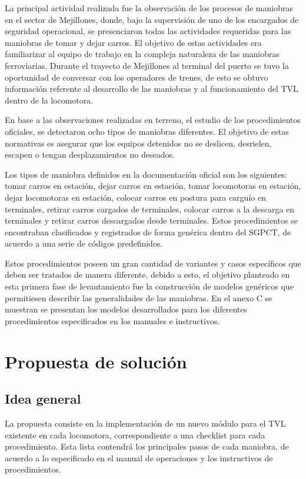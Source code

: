 \documentclass[oneside,12pt, letterpaper, titlepage]{book}
\begin{document}
La principal actividad realizada fue la observación de los procesos de maniobras en el sector de Mejillones, donde, bajo la supervisión de uno de los encargados de seguridad operacional, se presenciaron todas las actividades requeridas para las maniobras de tomar y dejar carros. El objetivo de estas actividades era familiarizar al equipo de trabajo en la compleja naturaleza de las maniobras ferroviarias. Durante el trayecto de Mejillones al terminal del puerto se tuvo la oportunidad de conversar con los operadores de trenes, de esto se obtuvo información referente al desarrollo de las maniobras y al funcionamiento del TVL dentro de la locomotora.

En base a las observaciones realizadas en terreno, el estudio de los procedimientos oficiales, se detectaron ocho tipos de maniobras diferentes. El objetivo de estas normativas es asegurar que los equipos detenidos no se deslicen, desrielen, escapen o tengan desplazamientos no deseados.

Los tipos de maniobra definidos en la documentación oficial son los siguientes: tomar carros en estación, dejar carros en estación, tomar locomotoras en estación, dejar locomotoras en estación, colocar carros en postura para carguío en terminales, retirar carros cargados de terminales, colocar carros a la descarga en terminales y retirar carros descargados desde terminales. Estos procedimientos se encontraban clasificados y registrados de forma genérica dentro del SGPCT, de acuerdo a una serie de códigos predefinidos.

Estos procedimientos poseen un gran cantidad de variantes y casos específicos que deben ser tratados de manera diferente, debido a esto, el objetivo planteado en esta primera fase de levantamiento fue la construcción de modelos genéricos que permitiesen describir las generalidades de las maniobras. En el anexo C se muestran se presentan los modelos desarrollados para los diferentes procedimientos especificados en los manuales e instructivos.  

\section{Propuesta de solución}
\subsection{Idea general}
La propuesta consiste en la implementación de un nuevo módulo para el TVL existente en cada locomotora, correspondiente a una checklist para cada procedimiento. Esta lista contendrá los principales pasos de cada maniobra, de acuerdo a lo especificado en el manual de operaciones y los instructivos de procedimientos.
\end{document}
